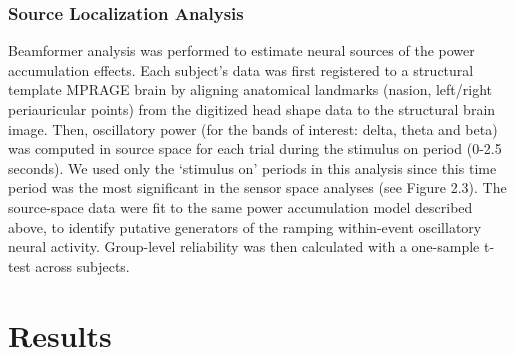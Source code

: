 \subsubsection{Source Localization
Analysis}\label{source-localization-analysis}

Beamformer analysis \autocite{gross_dynamic_2001} was performed to
estimate neural sources of the power accumulation effects. Each
subject's data was first registered to a structural template MPRAGE
brain \autocite{jenkinson_fsl_2012} by aligning anatomical landmarks
(nasion, left/right periauricular points) from the digitized head shape
data to the structural brain image. Then, oscillatory power (for the
bands of interest: delta, theta and beta) was computed in source space
for each trial during the stimulus on period (0-2.5 seconds). We used
only the `stimulus on' periods in this analysis since this time period
was the most significant in the sensor space analyses (see Figure 2.3).
The source-space data were fit to the same power accumulation model
described above, to identify putative generators of the ramping
within-event oscillatory neural activity. Group-level reliability was
then calculated with a one-sample t-test across subjects.

\section{Results}\label{results}

